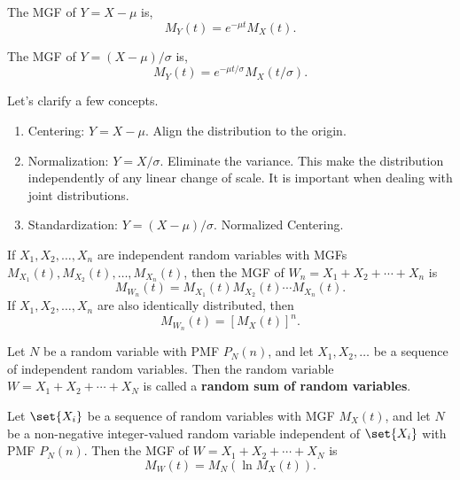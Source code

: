 \begin{corollary}
    The \textnormal{MGF} of $Y=X-\mu$ is,
    \[M_Y(t)=e^{-\mu t}M_X(t).\]
\end{corollary}

\begin{corollary}
    The \textnormal{MGF} of $Y=(X-\mu)/\sigma$ is,
    \[M_Y(t)=e^{-\mu t/\sigma}M_X(t/\sigma).\]
\end{corollary}

\begin{remark}
    Let's clarify a few concepts.
    \begin{enumerate}
        \item Centering: $Y=X-\mu$. Align the distribution to the origin.
        \item Normalization: $Y=X/\sigma$. Eliminate the variance. This make the distribution independently of any linear change of scale. It is important when dealing with joint distributions.
        \item Standardization: $Y=(X-\mu)/\sigma$. Normalized Centering.
    \end{enumerate}
\end{remark}

\begin{theorem}
    If $X_1,X_2,\ldots,X_n$ are independent random variables with \textnormal{MGF}s $M_{X_1}(t),M_{X_2}(t),\ldots,M_{X_n}(t)$, then the \textnormal{MGF} of $W_n=X_1+X_2+\cdots+X_n$ is
    \[M_{W_n}(t)=M_{X_1}(t)M_{X_2}(t)\cdots M_{X_n}(t).\]
    If $X_1,X_2,\ldots,X_n$ are also identically distributed, then
    \[M_{W_n}(t)=\left[M_{X}(t)\right]^n.\]
\end{theorem}

\begin{definition}
    Let $N$ be a random variable with \textnormal{PMF} $P_N(n)$, and let $X_1,X_2,\ldots$ be a sequence of independent random variables. Then the random variable $W=X_1+X_2+\cdots+X_N$ is called a \textbf{random sum of \iid random variables}.
\end{definition}

\begin{theorem}
    Let $\set{X_i}$ be a sequence of \iid random variables with \textnormal{MGF} $M_X(t)$, and let $N$ be a non-negative integer-valued random variable independent of $\set{X_i}$ with \textnormal{PMF} $P_N(n)$. Then the \textnormal{MGF} of $W=X_1+X_2+\cdots+X_N$ is
    \[M_W(t)=M_N(\ln M_X(t)).\]
\end{theorem}

